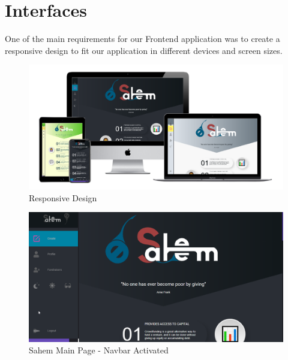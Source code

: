 
\section{Interfaces}

One of the main requirements for our Frontend application was to create a responsive design to fit our
application in different devices and screen sizes. 

\begin{figure}[H]
      \centering
      \includegraphics[scale=0.45]{assets/allDevices.png}
      \caption{Responsive Design}
      \label{fig:all devices}
\end{figure}


\begin{figure}[H]
      \centering
      \includegraphics[scale=0.45]{assets/screen-main-navbar.png}
      \caption{Sahem Main Page - Navbar Activated}
      \label{fig:sahem main}
\end{figure}

